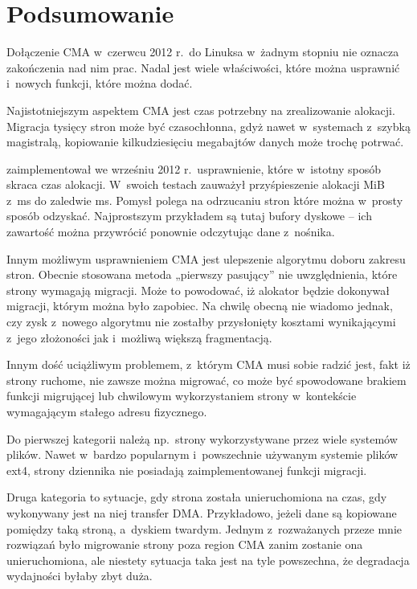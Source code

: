 \section{Podsumowanie}

Dołączenie CMA w~czerwcu 2012 r.\ do Linuksa w~żadnym stopniu nie
oznacza zakończenia nad nim prac.  Nadal jest wiele właściwości, które
można usprawnić i~nowych funkcji, które można dodać.

Najistotniejszym aspektem CMA jest czas potrzebny na zrealizowanie
alokacji.  Migracja tysięcy stron może być czasochłonna, gdyż nawet
w~systemach z~szybką magistralą, kopiowanie kilkudziesięciu megabajtów
danych może trochę potrwać.

\textcite{patch:cma-discard} zaimplementował we wrześniu 2012
r.\ usprawnienie, które w~istotny sposób skraca czas alokacji.
W~swoich testach zauważył przyśpieszenie alokacji \unit[10]{MiB}
z~\unit[146]{ms} do zaledwie \unit[7]{ms}.  Pomysł polega na
odrzucaniu stron które można w~prosty sposób odzyskać.  Najprostszym
przykładem są tutaj bufory dyskowe -- ich zawartość można przywrócić
ponownie odczytując dane z~nośnika.

Innym możliwym usprawnieniem CMA jest ulepszenie algorytmu doboru
zakresu stron.  Obecnie stosowana metoda „pierwszy pasujący” nie
uwzględnienia, które strony wymagają migracji.  Może to powodować, iż
alokator będzie dokonywał migracji, którym można było zapobiec.  Na
chwilę obecną nie wiadomo jednak, czy zysk z~nowego algorytmu nie
zostałby przysłonięty kosztami wynikającymi z~jego złożoności jak
i~możliwą większą fragmentacją.

Innym dość uciążliwym problemem, z~którym CMA musi sobie radzić jest,
fakt iż strony ruchome, nie zawsze można migrować, co może być
spowodowane brakiem funkcji migrującej lub chwilowym wykorzystaniem
strony w~kontekście wymagającym stałego adresu fizycznego.

Do pierwszej kategorii należą np.\ strony wykorzystywane przez wiele
systemów plików.  Nawet w~bardzo popularnym i~powszechnie używanym
systemie plików ext4, strony dziennika nie posiadają zaimplementowanej
funkcji migracji.

Druga kategoria to sytuacje, gdy strona została unieruchomiona na
czas, gdy wykonywany jest na niej transfer DMA.  Przykładowo, jeżeli
dane są kopiowane pomiędzy taką stroną, a~dyskiem twardym.  Jednym
z~rozważanych przeze mnie rozwiązań było migrowanie strony poza region
CMA zanim zostanie ona unieruchomiona, ale niestety sytuacja taka jest
na tyle powszechna, że degradacja wydajności byłaby zbyt duża.


